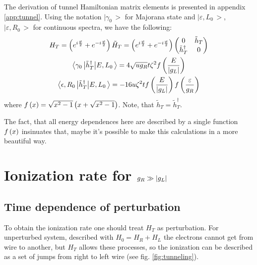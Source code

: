 The derivation of tunnel Hamiltonian matrix elements is presented in appendix \ref{app:tunnel}. Using the notation  $ \big|\gamma_{0}\,\big> $ for Majorana state and $ \big|\varepsilon,L_{0}\,\big> $, $ \big|\varepsilon,R_{0}\,\big> $ for continuous spectra, we have the following:
\begin{gather}
H_T=
\left(e^{i\frac{\varphi}{2}}+e^{-i\frac{\varphi}{2}}\right)
\tilde{H}_{T}
=
\left(e^{i\frac{\varphi}{2}}+e^{-i\frac{\varphi}{2}}\right)
\begin{pmatrix}
0 & \tilde{h}_{T} \\
\tilde{h}_T^\dagger & 0
\end{pmatrix}
\\
\label{tunnel_matrix_elements_maj-cont}
	\big<\gamma_{0}\,\big|\tilde{h}_{T}^{\dagger}\big|E,L_{0}\,\big>
	=
	4\sqrt{ug_{R}}
	t\zeta^{2}
	f\left(\frac{E}{\left|g_L\right|}\right)
	\\
	\label{tunnel_matrix_elements_cont-cont}
	\big<\epsilon,R_{0}\,\big|\tilde{h}_{T}^{\dagger}\big|E,L_{0}\,\big>
	=
	-16u\zeta^{2}t
	f\left(\frac{E}{\left|g_L\right|}\right)
	f\left(\frac{\varepsilon}{g_R}\right)
\end{gather}
where $ f\left(x\right)=\sqrt{x^2-1}\left(x+\sqrt{x^2-1}\right) $. Note, that $ \tilde{h}_{T} =\tilde{h}_{T}^\dagger $.

 The fact, that all energy dependences here are described by a single function $ f\left(x\right) $ insinuates that, maybe it's possible to make this calculations in a more beautiful way.

\section{Ionization rate for $ g_R\gg\left|g_L\right| $}


\subsection{Time dependence of perturbation}

To obtain the ionization rate one should treat $ H_T $ as perturbation. For unperturbed system, described with $ H_0=H_R+H_L $ the electrons cannot get from wire to another, but $ H_T $ allows these processes, so the ionization can be described as a set of jumps from right to left wire (see fig. \ref{fig:tunneling}).

